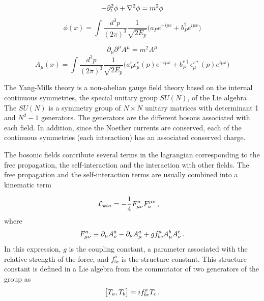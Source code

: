 \begin{equation}
    -\partial_t^2 \phi + \nabla^2 \phi = m^2 \phi \newline
    \label{eq:kleingordon}
\end{equation}
\begin{equation}
    \phi(x) = \int \frac{d^3 p}{(2\pi)^3} \frac{1}{\sqrt{2E_p}} \big( a_P e^{-ipx} + b_P^{\dagger} e^{ipx} \big)
\end{equation}

\begin{equation}
    \partial_{\mu}\partial^{\mu}A^{\mu} = m^2 A^{\mu}
    \label{eq:proca}
\end{equation}
\begin{equation}
    A_{\mu}(x) = \int \frac{d^3 p}{(2\pi)^3} \frac{1}{\sqrt{2E_p}} \big( a_{P}^{r} \epsilon_{\mu}^{r}(p) e^{-ipx} + b_{P}^{r\dagger} \epsilon_{\mu}^{r*}(p) e^{ipx} \big)
\end{equation}

The Yang-Mills theory \cite{PhysRev.96.191} is a non-abelian gauge field theory based on the internal continuous symmetries, the special unitary group $SU(N)$, of the Lie algebra . The $SU(N)$ is a symmetry group of $N \times N$ unitary matrices with determinant 1 and $N^2 -1$ generators. The generators are the different bosons associated with each field. In addition, since the Noether currents are conserved, each of the continuous symmetries (each interaction) has an associated conserved charge.

The bosonic fields contribute several terms in the lagrangian corresponding to the free propagation, the self-interaction and the interaction with other fields. The free propagation and the self-interaction terms are usually combined into a kinematic term

\begin{equation}
    \Lagr_{kin} = -\frac{1}{4}F^{a}_{\mu\nu}F_{a}^{\mu\nu} \msep
\end{equation}
where
\begin{equation}
    F^{a}_{\mu\nu} \equiv \partial_{\mu}A_{\nu}^a - \partial_{\nu}A_{\mu}^a + g f_{bc}^a A_{\mu}^b A_{\nu}^c \mend
\end{equation}
In this expression, $g$ is the coupling constant, a parameter associated with the relative strength of the force, and $f_{bc}^a$ is the structure constant. This structure constant is defined in a Lie algebra from the commutator of two generators of the group as
\begin{equation}
    \big[ T_a , T_b \big] = i f_{bc}^a T_c \mend
    \label{eq:commut}
\end{equation}

